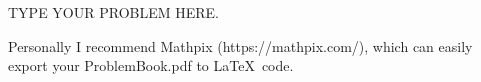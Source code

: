 \documentclass[10pt, a4paper]{article}
\newenvironment{Solution}{
  \large
  }
{
  \newpage
}
\newenvironment{problem}[1]{
  \begin{Problem}
  #1
  \end{Problem}
  \begin{Solution}
}
{
  \end{Solution}
}
\newcommand\CourseName{Stochastic Processes} %
\newcommand\CourseID{Math 632} %
\newcommand\hwnumber{1}                          %
\newcommand\Information{Guy Matz}                %
\begin{document}
\begin{titlepage}
\end{titlepage}


\begin{problem}{TYPE YOUR PROBLEM HERE.}
Personally I recommend Mathpix (https://mathpix.com/), which can easily export your ProblemBook.pdf to \LaTeX \ code.

\end{problem}

\end{document}
